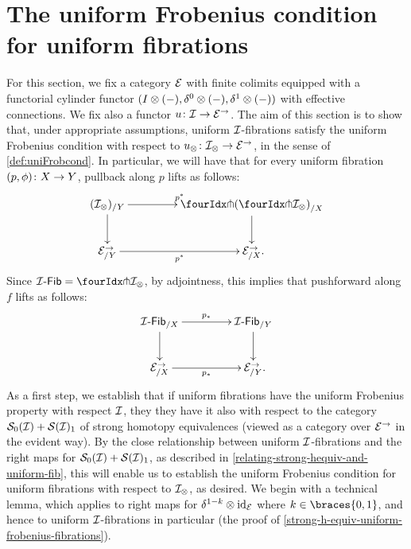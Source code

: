 \documentclass[reqno,10pt,a4paper,oneside,draft]{amsart}
\begin{document}
\section{The uniform Frobenius condition for uniform fibrations}
\label{sec:frocuf}

For this section, we fix a category $\catE$ with finite colimits equipped with a functorial cylinder functor $(\interval \otimes (-), \lcyl \otimes (-), \rcyl \otimes (-))$ with effective connections.
We fix also a functor $u \co \cal{I} \to \catE^\to$.
The aim of this section is to show that, under appropriate assumptions, uniform $\cal{I}$-fibrations satisfy the uniform Frobenius condition with respect to $u_\otimes \co \cal{I}_\otimes \to \cal{E}^\to$, in the sense of \cref{def:uniFrobcond}.
In particular, we will have that for every uniform fibration $(p, \phi) \co X \to Y$, pullback along $p$ lifts as follows:
\[
\xymatrix@C+2em{
  (\cal{I}_\otimes)_{/Y}
  \ar[r]^{p^*}
  \ar[d]
&
  \liftl{(\liftr{\cal{I}_\otimes})}_{/X}
  \ar[d]
\\
  \cal{E}^\to_{/Y}
  \ar[r]_{p^*}
&
  \cal{E}^\to_{/X}
\rlap{.}}
\]
Since $\Fib[\cal{I}]  = \liftr{\cal{I}_\otimes}$, by adjointness, this implies that pushforward along $f$ lifts as follows:
\[
\xymatrix@C+2em{
  \Fib[\cal{I}]_{/X}
  \ar[r]^{p_*}
  \ar[d]
&
  \Fib[\cal{I}]_{/Y}
  \ar[d]
\\
  \cal{E}^\to_{/X}
  \ar[r]_{p_*}
&
  \cal{E}^\to_{/Y}
\rlap{.}}
\]
As a first step, we establish that if uniform fibrations have the uniform Frobenius property with respect $\cal{I}$, they they have it also with respect to the category $\cal{S}_0(\cal{I}) + \cal{S}(\cal{I})_1$ of strong homotopy equivalences (viewed as a category over $\cal{E}^\to$ in the evident way).
By the close relationship between uniform $\cal{I}$-fibrations and the right maps for $\cal{S}_0(\cal{I}) + \cal{S}(\cal{I})_1$, as described in \cref{relating-strong-hequiv-and-uniform-fib}, this will enable us to establish the uniform Frobenius condition for uniform fibrations with respect to $\cal{I}_\otimes$, as desired.
We begin with a technical lemma, which applies to right maps for $\kcylinv \otimes \id_{\calE}$ where $k \in \braces{0, 1}$, and hence to uniform $\cal{I}$-fibrations in particular (\cf the proof of \cref{strong-h-equiv-uniform-frobenius-fibrations}).
\end{document}
